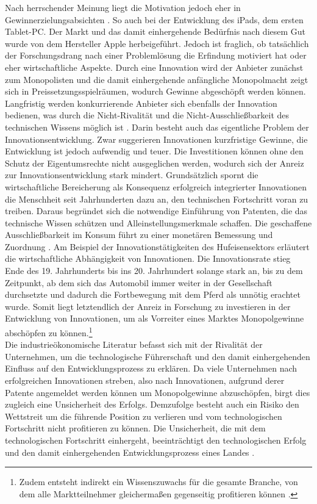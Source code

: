 Nach herrschender Meinung liegt die Motivation jedoch eher in Gewinnerzielungsabsichten \cite{Romer.1993,Grossman1989b.}. So auch bei der Entwicklung des iPads, dem ersten Tablet-PC. Der Markt und das damit einhergehende Bedürfnis nach diesem Gut wurde von dem Hersteller Apple herbeigeführt. Jedoch ist fraglich, ob tatsächlich der Forschungsdrang nach einer Problemlösung die Erfindung motiviert hat oder eher wirtschaftliche Aspekte. Durch eine Innovation wird der Anbieter zunächst zum Monopolisten und die damit einhergehende anfängliche Monopolmacht zeigt sich in Preissetzungsspielräumen, wodurch Gewinne abgeschöpft werden können. Langfristig werden konkurrierende Anbieter sich ebenfalls der Innovation bedienen, was durch die Nicht-Rivalität und die Nicht-Ausschließbarkeit des technischen Wissens möglich ist \cite{Romer.1993}. Darin besteht auch das eigentliche Problem der Innovationsentwicklung. Zwar suggerieren Innovationen kurzfristige Gewinne, die Entwicklung ist jedoch aufwendig und teuer. Die Investitionen können ohne den Schutz der Eigentumsrechte nicht ausgeglichen werden, wodurch sich der Anreiz zur Innovationsentwicklung stark mindert. Grundsätzlich spornt die wirtschaftliche Bereicherung als Konsequenz erfolgreich integrierter Innovationen die Menschheit seit Jahrhunderten dazu an, den technischen Fortschritt voran zu treiben. Daraus begründet sich die notwendige Einführung von Patenten, die das technische Wissen schützen und Alleinstellungsmerkmale schaffen. Die geschaffene Ausschließbarkeit im Konsum führt zu einer monetären Bemessung und Zuordnung \cite[Kapitel 12,S.414]{Acemoglu.2009}. Am Beispiel der Innovationstätigkeiten des Hufeisensektors erläutert \cite{Schmookler.1966} die wirtschaftliche Abhängigkeit von Innovationen. Die Innovationsrate stieg Ende des 19. Jahrhunderts bis ins 20. Jahrhundert solange stark an, bis zu dem Zeitpunkt, ab dem sich das Automobil immer weiter in der Gesellschaft durchsetzte und dadurch die Fortbewegung mit dem Pferd als unnötig erachtet wurde. Somit liegt letztendlich der Anreiz in Forschung zu investieren in der Entwicklung von Innovationen, um als Vorreiter eines Marktes Monopolgewinne abschöpfen zu können.\footnote{Zudem entsteht indirekt ein Wissenszuwachs für die gesamte Branche, von dem alle Marktteilnehmer gleichermaßen gegenseitig profitieren können \cite{Cohen.1989}.}\\
%
Die industrieökonomische Literatur befasst sich mit der Rivalität der Unternehmen, um die technologische Führerschaft und den damit einhergehenden Einfluss auf den Entwicklungsprozess zu erklären. Da viele Unternehmen nach erfolgreichen Innovationen streben, also nach Innovationen, aufgrund derer Patente angemeldet werden können um Monopolgewinne abzuschöpfen, birgt dies zugleich eine Unsicherheit des Erfolgs. Demzufolge besteht auch ein Risiko den Wettstreit um die führende Position zu verlieren und vom technologischen Fortschritt nicht profitieren zu können. Die Unsicherheit, die mit dem technologischen Fortschritt einhergeht, beeinträchtigt den technologischen Erfolg und den damit einhergehenden Entwicklungsprozess eines Landes \cite[S. 22]{Reinganum.1981}.\\
